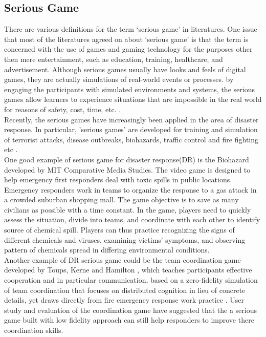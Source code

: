 \subsection{Serious Game}
There are various definitions for the term `serious game' in literatures. One issue that most of the literatures agreed on about `serious game' is that the term is concerned with the use of games and gaming technology for the purposes other then mere entertainment, such as education, training, healthcare, and advertisement. Although serious games usually have looks and feels of digital games, they are actually simulations of real-world events or processes. by engaging the participants with simulated environments and systems, the serious games allow learners to experience situations that are impossible in the real world for reasons of safety, cost, time, etc. \cite{Susi2007,Squire2003,Meesters2013}. \\

Recently, the serious games have increasingly been applied in the area of disaster response. In particular, 'serious games' are developed for training and simulation of terrorist attacks, disease outbreaks, biohazards, traffic control and fire fighting etc \cite{Susi2007,Squire2003}. \\

One good example of serious game for disaster response(DR) is the Biohazard developed by MIT Comparative Media Studies. The video game is designed to help emergency first responders deal with toxic spills in public locations. Emergency responders work in teams to organize the response to a gas attack in a crowded suburban shopping mall. The game objective is to save as many civilians as possible with a time constant. In the game,  players need to quickly assess the situation, divide into teams, and coordinate with each other to identify source of chemical spill. Players can thus practice recognizing the signs of different chemicals and viruses, examining victims' symptoms, and observing pattern of chemicals spread in differing environmental conditions.\\


Another example of DR serious game could be the team coordination game developed by Toups, Kerne and Hamilton \cite{Toups2011}, which teaches participants effective cooperation and in particular communication, based on a zero-fidelity simulation of team coordination that focuses on distributed cognition in lieu of concrete details, yet draws directly from fire emergency response work practice \cite{Toups2011}. User study and evaluation of the coordination game have suggested that the a serious game built with low fidelity approach can still help responders to improve there coordination skills.\\

